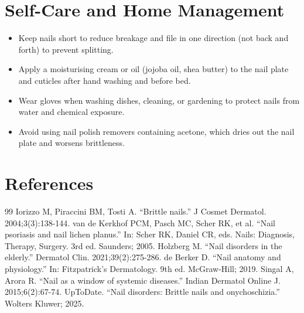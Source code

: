 \section*{Self-Care and Home Management}
\begin{itemize}
 \item Keep nails short to reduce breakage and file in one direction (not back and forth) to prevent splitting.
 \item Apply a moisturising cream or oil (jojoba oil, shea butter) to the nail plate and cuticles after hand washing and before bed.
 \item Wear gloves when washing dishes, cleaning, or gardening to protect nails from water and chemical exposure.
 \item Avoid using nail polish removers containing acetone, which dries out the nail plate and worsens brittleness.
\end{itemize}

\section*{References}
\begin{thebibliography}{99}
 Iorizzo M, Piraccini BM, Tosti A. ``Brittle nails.'' J Cosmet Dermatol. 2004;3(3):138-144.
 van de Kerkhof PCM, Pasch MC, Scher RK, et al. ``Nail psoriasis and nail lichen planus.'' In: Scher RK, Daniel CR, eds. Nails: Diagnosis, Therapy, Surgery. 3rd ed. Saunders; 2005.
 Holzberg M. ``Nail disorders in the elderly.'' Dermatol Clin. 2021;39(2):275-286.
 de Berker D. ``Nail anatomy and physiology.'' In: Fitzpatrick's Dermatology. 9th ed. McGraw-Hill; 2019.
 Singal A, Arora R. ``Nail as a window of systemic diseases.'' Indian Dermatol Online J. 2015;6(2):67-74.
 UpToDate. ``Nail disorders: Brittle nails and onychoschizia.'' Wolters Kluwer; 2025.
\end{thebibliography}
